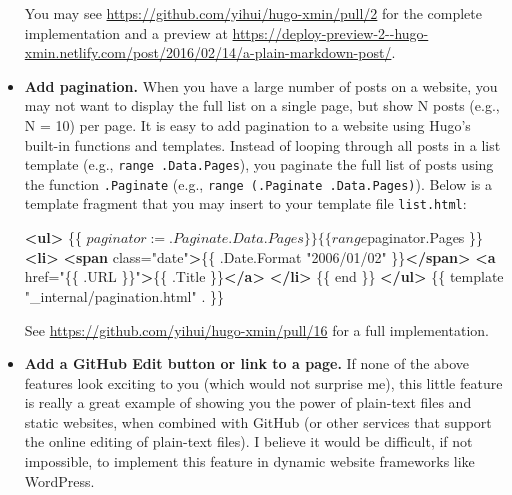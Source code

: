 \documentclass[12pt,]{krantz}
\makeatletter
\newenvironment{Shaded}{\begin{snugshade}}{\end{snugshade}}
\newcommand{\KeywordTok}[1]{\textcolor[rgb]{0.13,0.29,0.53}{\textbf{#1}}}
\newcommand{\NormalTok}[1]{#1}
\newcommand{\OtherTok}[1]{\textcolor[rgb]{0.56,0.35,0.01}{#1}}
\newcommand{\StringTok}[1]{\textcolor[rgb]{0.31,0.60,0.02}{#1}}
\newenvironment{kframe}{%
\medskip{}
\setlength{\fboxsep}{.8em}
 \def\at@end@of@kframe{}%
 \ifinner\ifhmode%
  \def\at@end@of@kframe{\end{minipage}}%
  \begin{minipage}{\columnwidth}%
 \fi\fi%
 \def\FrameCommand##1{\hskip\@totalleftmargin \hskip-\fboxsep
 \colorbox{shadecolor}{##1}\hskip-\fboxsep
     \hskip-\linewidth \hskip-\@totalleftmargin \hskip\columnwidth}%
 \MakeFramed {\advance\hsize-\width
   \@totalleftmargin\z@ \linewidth\hsize
   \@setminipage}}%
 {\par\unskip\endMakeFramed%
 \at@end@of@kframe}
\renewenvironment{Shaded}{\begin{kframe}}{\end{kframe}}
\theoremstyle{definition}
\theoremstyle{definition}
\theoremstyle{definition}
\theoremstyle{remark}
\makeatother
\begin{document}
\begin{itemize}
  You may see \url{https://github.com/yihui/hugo-xmin/pull/2} for the
  complete implementation and a preview at
  \url{https://deploy-preview-2--hugo-xmin.netlify.com/post/2016/02/14/a-plain-markdown-post/}.
\item
  \textbf{Add pagination.} When you have a large number of posts on a
  website, you may not want to display the full list on a single page,
  but show N posts (e.g., N = 10) per page. It is easy to add pagination
  to a website using Hugo's built-in functions and templates. Instead of
  looping through all posts in a list template (e.g.,
  \texttt{range\ .Data.Pages}), you paginate the full list of posts
  using the function \texttt{.Paginate} (e.g.,
  \texttt{range\ (.Paginate\ .Data.Pages)}). Below is a template
  fragment that you may insert to your template file \texttt{list.html}:

\begin{Shaded}
\begin{Highlighting}[]
\KeywordTok{<ul>}
\NormalTok{  \{\{ $paginator := .Paginate .Data.Pages \}\}}
\NormalTok{  \{\{ range $paginator.Pages \}\}}
  \KeywordTok{<li>}
    \KeywordTok{<span}\OtherTok{ class=}\StringTok{"date"}\KeywordTok{>}\NormalTok{\{\{ .Date.Format "2006/01/02" \}\}}\KeywordTok{</span>}
    \KeywordTok{<a}\OtherTok{ href=}\StringTok{"\{\{ .URL \}\}"}\KeywordTok{>}\NormalTok{\{\{ .Title \}\}}\KeywordTok{</a>}
  \KeywordTok{</li>}
\NormalTok{  \{\{ end \}\}}
\KeywordTok{</ul>}
\NormalTok{\{\{ template "_internal/pagination.html" . \}\}}
\end{Highlighting}
\end{Shaded}

  See \url{https://github.com/yihui/hugo-xmin/pull/16} for a full
  implementation.
\item
  \textbf{Add a GitHub Edit button or link to a page.} If
  none of the above features look exciting to
  you (which would not surprise me), this little feature is really a
  great example of showing you the power of plain-text files and static
  websites, when combined with GitHub (or other services that support
  the online editing of plain-text files). I believe it would be
  difficult, if not impossible, to implement this feature in dynamic
  website frameworks like WordPress.


\end{itemize}
\end{document}
